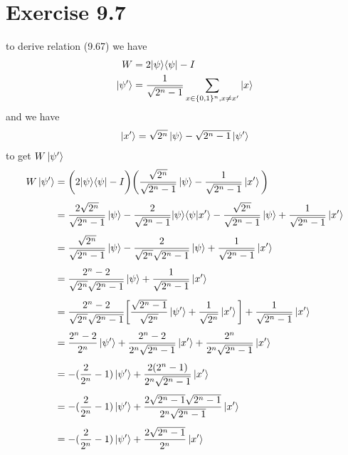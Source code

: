 \documentclass{article}
\newcommand{\op}[2]{|#1\rangle \langle#2|}
\begin{document}
\section*{Exercise 9.7}
to derive relation (9.67) we have
\begin{align*}
    W &= 2\op{\psi}{\psi} - I \\
    \ket{\psi^{\prime}} &= \frac{1}{\sqrt{2^n - 1}} \sum_{x\in\{0,1\}^{n},x\neq x^{\prime}} \ket{x}
\end{align*}
and we have 
\begin{align*}
    \ket{x^{\prime}} = \sqrt{2^n}\ket{\psi} - \sqrt{2^n - 1}\ket{\psi^{\prime}}
\end{align*}
to get $W\ket{\psi^{\prime}}$
\begin{align*}
    W\ket{\psi^{\prime}} &= \bigg(2\op{\psi}{\psi} - I\bigg)\bigg(\frac{\sqrt{2^n}}{\sqrt{2^n - 1}}\ket{\psi} - \frac{1}{\sqrt{2^n - 1}}\ket{x^{\prime}}\bigg) \\[0.4em]
    &= \frac{2\sqrt{2^n}}{\sqrt{2^n - 1}}\ket{\psi} - \frac{2}{\sqrt{2^n - 1}}\op{\psi}{\psi}x^{\prime}\rangle - \frac{\sqrt{2^n}}{\sqrt{2^n - 1}}\ket{\psi} + \frac{1}{\sqrt{2^n - 1}}\ket{x^{\prime}} \\[0.4em]
    &= \frac{\sqrt{2^n}}{\sqrt{2^n - 1}}\ket{\psi} - \frac{2}{\sqrt{2^n}\sqrt{2^n - 1}}\ket{\psi} + \frac{1}{\sqrt{2^n - 1}}\ket{x^{\prime}} \\[0.4em]
    &= \frac{2^n - 2}{\sqrt{2^n}\sqrt{2^n - 1}}\ket{\psi} + \frac{1}{\sqrt{2^n - 1}}\ket{x^{\prime}} \\[0.4em]
    &= \frac{2^n - 2}{\sqrt{2^n}\sqrt{2^n - 1}}\bigg[\frac{\sqrt{2^n - 1}}{\sqrt{2^n}}\ket{\psi^{\prime}} + \frac{1}{\sqrt{2^n}}\ket{x^{\prime}}\bigg] + \frac{1}{\sqrt{2^n - 1}}\ket{x^{\prime}} \\[0.4em]
    &= \frac{2^n - 2}{2^n}\ket{\psi^{\prime}} + \frac{2^n - 2}{2^n\sqrt{2^n - 1}}\ket{x^{\prime}} + \frac{2^n}{2^n \sqrt{2^n - 1}}\ket{x^{\prime}} \\[0.4em]
    &= -(\frac{2}{2^n} - 1)\ket{\psi^{\prime}} + \frac{2(2^n - 1)}{2^n\sqrt{2^n - 1}}\ket{x^{\prime}} \\[0.4em]
    &= -(\frac{2}{2^n} - 1)\ket{\psi^{\prime}} + \frac{2\sqrt{2^n - 1}\sqrt{2^n - 1}}{2^n\sqrt{2^n - 1}}\ket{x^{\prime}} \\[0.4em]
    &= -(\frac{2}{2^n} - 1)\ket{\psi^{\prime}} + \frac{2\sqrt{2^n - 1}}{2^n}\ket{x^{\prime}} \\
\end{align*}
\end{document}
